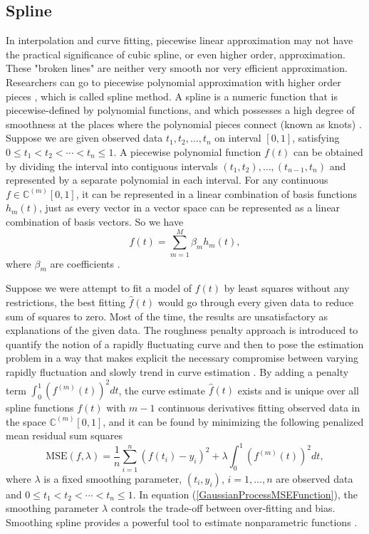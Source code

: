 \subsection{Spline}

In interpolation and curve fitting, piecewise linear approximation may not have the practical significance of cubic spline, or even higher order, approximation. These "broken lines" are neither very smooth nor very efficient approximation. Researchers can go to piecewise polynomial approximation with higher order pieces \cite{de1978practical}, which is called spline method. A spline is a numeric function that is piecewise-defined by polynomial functions, and which possesses a high degree of smoothness at the places where the polynomial pieces connect (known as knots) \cite{judd1998numerical}\cite{chen2009feedback}. Suppose we are given observed data $t_1,t_2, \ldots, t_n$ on interval $[0,1]$, satisfying $0\leq t_1< t_2 < \cdots <t_n \leq 1$. A piecewise polynomial function $f(t)$ can be obtained by dividing the interval into contiguous intervals $(t_1,t_2),\ldots,(t_{n-1},t_n)$ and represented by a separate polynomial in each interval. For any continuous $f\in \mathbb{C}^{(m)}[0,1]$, it can be represented in a linear combination of basis functions $h_m(t)$, just as every vector in a vector space can be represented as a linear combination of basis vectors. So we have
\begin{equation}\label{fbasis}
f(t) =\sum_{m=1}^{M}\beta_mh_m(t),
\end{equation}
where $\beta_m$ are coefficients \cite{ellis2009}. 

Suppose we were attempt to fit a model of $f(t)$ by least squares without any restrictions, the best fitting $\hat{f}(t)$ would go through every given data to reduce sum of squares to zero. Most of the time, the results are unsatisfactory as explanations of the given data. The roughness penalty approach is introduced to quantify the notion of a rapidly fluctuating curve and then to pose the estimation problem in a way that makes explicit the necessary compromise between varying rapidly fluctuation and slowly trend in curve estimation \cite{green1993nonparametric}. By adding a penalty term $\int_{0}^{1}(f^{(m)}(t))^2dt$, the curve estimate $\hat{f}(t)$ exists and is unique over all spline functions $f(t)$ with $m-1$ continuous derivatives fitting observed data in the space $\mathbb{C}^{(m)}[0,1]$, and it can be found by minimizing the following penalized mean residual sum  squares
\begin{equation}\label{GaussianProcessMSEFunction}
\text{MSE}(f,\lambda)=\frac{1}{n}\sum_{i=1}^n(f(t_i)-y_i)^2+\lambda \int_{0}^{1}(f^{(m)}(t))^2dt,
\end{equation}
where $\lambda$ is a fixed smoothing parameter, $(t_i,y_i)$, $i=1, \ldots, n$ are observed data and $0 \leq t_1< t_2 < \cdots <t_n \leq 1$. In equation (\ref{GaussianProcessMSEFunction}),  the smoothing parameter $\lambda$ controls the trade-off between over-fitting and bias. Smoothing spline provides a powerful tool to estimate nonparametric functions \cite{hastie1990generalized}. 

